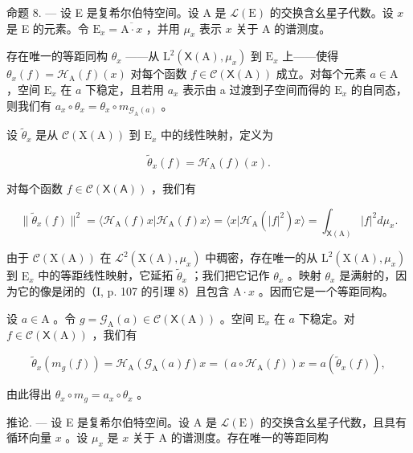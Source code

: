 命题 8. --- 设 E 是复希尔伯特空间。设 A 是 \(\mathcal{L}(\mathrm{E})\) 的交换含幺星子代数。设 \(x\) 是 E 的元素。令 \(\mathrm{E}_x = \overline{\mathrm{A} \cdot x}\) ，并用 \(\mu_x\) 表示 \(x\) 关于 A 的谱测度。

存在唯一的等距同构 \(\theta_x\) ——从 \(\mathrm{L}^2 (\mathsf{X}(\mathrm{A}),\mu_x)\) 到 \(\mathrm{E}_x\) 上——使得 \(\theta_{x}(f) = \mathcal{H}_{\mathrm{A}}(f)(x)\) 对每个函数 \(f\in \mathcal{C}(\mathsf{X}(\mathrm{A}))\) 成立。对每个元素 \(a\in \mathrm{A}\) ，空间 \(\mathrm{E}_x\) 在 \(a\) 下稳定，且若用 \(a_{x}\) 表示由 a 过渡到子空间而得的 \(\mathrm{E}_x\) 的自同态，则我们有 \(a_{x}\circ \theta_{x} = \theta_{x}\circ m_{\mathcal{G}_{\mathrm{A}}(a)}\) 。

设 \(\widetilde{\theta}_x\) 是从 \(\mathcal{C}(\mathrm{X(A)})\) 到 \(\mathrm{E}_x\) 中的线性映射，定义为

\[
\widetilde {\theta} _ {x} (f) = \mathcal {H} _ {\mathrm{A}} (f) (x).
\]

对每个函数 \(f \in \mathcal{C}(\mathsf{X}(\mathsf{A}))\) ，我们有

\[
\| \widetilde {\theta} _ {x} (f) \| ^ {2} = \langle \mathcal {H} _ {\mathrm{A}} (f) x | \mathcal {H} _ {\mathrm{A}} (f) x \rangle = \langle x | \mathcal {H} _ {\mathrm{A}} (| f | ^ {2}) x \rangle = \int_ {\mathsf {X} (\mathrm{A})} | f | ^ {2} d \mu_ {x}.
\]

由于 \(\mathcal{C}(\mathrm{X(A)})\) 在 \(\mathcal{L}^2 (\mathrm{X(A)},\mu_x)\) 中稠密，存在唯一的从 \(\mathrm{L}^2 (\mathrm{X(A)},\mu_x)\) 到 \(\mathrm{E}_x\) 中的等距线性映射，它延拓 \(\widetilde{\theta}_x\) ；我们把它记作 \(\theta_{x}\) 。映射 \(\theta_{x}\) 是满射的，因为它的像是闭的（I, p. 107 的引理 8）且包含 \(\mathrm{A}\cdot x\) 。因而它是一个等距同构。

设 \(a \in \mathrm{A}\) 。令 \(g = \mathcal{G}_{\mathrm{A}}(a) \in \mathcal{C}(\mathsf{X}(\mathrm{A}))\) 。空间 \(\mathrm{E}_x\) 在 \(a\) 下稳定。对 \(f \in \mathcal{C}(\mathsf{X}(\mathrm{A}))\) ，我们有

\[
\widetilde {\theta} _ {x} (m _ {g} (f)) = \mathcal {H} _ {\mathrm{A}} (\mathcal {G} _ {\mathrm{A}} (a) f) x = (a \circ \mathcal {H} _ {\mathrm{A}} (f)) x = a (\widetilde {\theta} _ {x} (f)),
\]

由此得出 \(\theta_x \circ m_g = a_x \circ \theta_x\) 。

推论. — 设 E 是复希尔伯特空间。设 A 是 \(\mathcal{L}(\mathrm{E})\) 的交换含幺星子代数，且具有循环向量 \(x\) 。设 \(\mu_x\) 是 \(x\) 关于 A 的谱测度。存在唯一的等距同构

